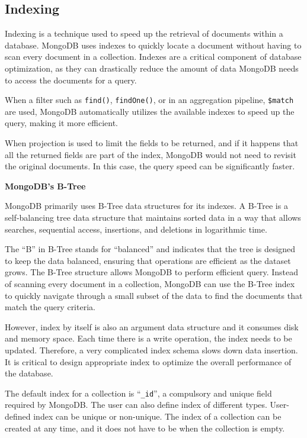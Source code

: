 \subsection{Indexing}

Indexing is a technique used to speed up the retrieval of documents within a database. MongoDB uses indexes to quickly locate a document without having to scan every document in a collection. Indexes are a critical component of database optimization, as they can drastically reduce the amount of data MongoDB needs to access the documents for a query. 

When a filter such as \verb|find()|, \verb|findOne()|, or in an aggregation pipeline, \verb|$match| are used, MongoDB automatically utilizes the available indexes to speed up the query, making it more efficient.

When projection is used to limit the fields to be returned, and if it happens that all the returned fields are part of the index, MongoDB would not need to revisit the original documents. In this case, the query speed can be significantly faster.

\begin{mdframed}
\noindent \textbf{MongoDB's B-Tree}

MongoDB primarily uses B-Tree data structures for its indexes. A B-Tree is a self-balancing tree data structure that maintains sorted data in a way that allows searches, sequential access, insertions, and deletions in logarithmic time. 

The ``B'' in B-Tree stands for ``balanced'' and indicates that the tree is designed to keep the data balanced, ensuring that operations are efficient as the dataset grows. The B-Tree structure allows MongoDB to perform efficient query. Instead of scanning every document in a collection, MongoDB can use the B-Tree index to quickly navigate through a small subset of the data to find the documents that match the query criteria.
\end{mdframed}

However, index by itself is also an argument data structure and it consumes disk and memory space. Each time there is a write operation, the index needs to be updated. Therefore, a very complicated index schema slows down data insertion. It is critical to design appropriate index to optimize the overall performance of the database.

The default index for a collection is ``\verb|_id|'', a compulsory and unique field required by MongoDB. The user can also define index of different types. User-defined index can be unique or non-unique. The index of a collection can be created at any time, and it does not have to be when the collection is empty.

